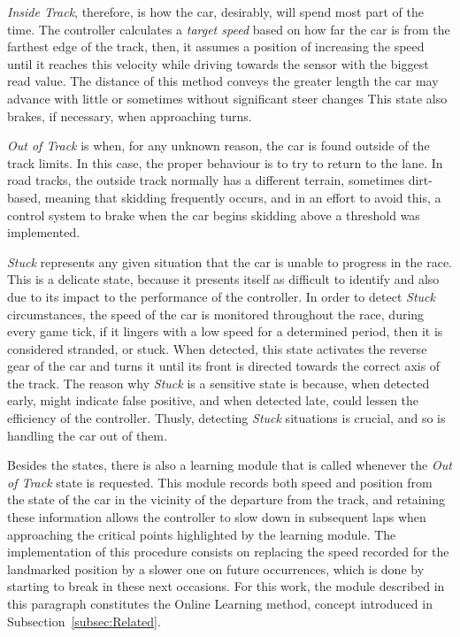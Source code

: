 	\emph{Inside Track}, therefore, is how the car, desirably, will spend most part of the time. The controller
	calculates a \emph{target speed} based on how far the car is from the farthest edge of the track, then, it assumes
	a position of increasing the speed until it reaches this velocity while driving towards the sensor with the
	biggest read value. The distance of this method conveys the greater length the car may advance with little or
	sometimes without significant steer changes This state also brakes, if necessary, when approaching turns.
		
	\emph{Out of Track} is when, for any unknown reason, the car is found outside of the track limits. In this case,
	the proper behaviour is to try to return to the lane. In road tracks, the outside track normally has a different
	terrain, sometimes dirt-based, meaning that skidding frequently occurs, and in an effort to avoid this, a control
	system to brake when the car begins skidding above a threshold was implemented.
	
	\emph{Stuck} represents any given situation that the car is unable to progress in the race. This is a delicate
	state, because it presents itself as difficult to identify and also due to its impact to the performance of the
	controller. In order to detect \emph{Stuck} circumstances, the speed of the car is monitored throughout the race,
	during every game tick, if it lingers with a low speed for a determined period, then it is considered stranded,
	or stuck. When detected, this state activates the reverse gear of the car and turns it until its front is
	directed towards the correct axis of the track. The reason why \emph{Stuck} is a sensitive state is because, when
	detected early, might indicate false positive, and when detected late, could lessen the efficiency of the
	controller. Thusly, detecting \textit{Stuck} situations is crucial, and so is handling the car out of them.
	
	Besides the states, there is also a learning module that is called whenever the \emph{Out of Track} state is
	requested. This module records both speed and position from the state of the car in the vicinity of the departure
	from the track, and retaining these information allows the controller to slow down in subsequent laps when
	approaching the critical points highlighted by the learning module. The implementation of this procedure consists
	on replacing the speed recorded for the landmarked position by a slower one on future occurrences, which is done
	by starting to break in these next occasions. For this work, the module described in this paragraph constitutes
	the Online Learning method, concept introduced in Subsection~\ref{subsec:Related}.
	
